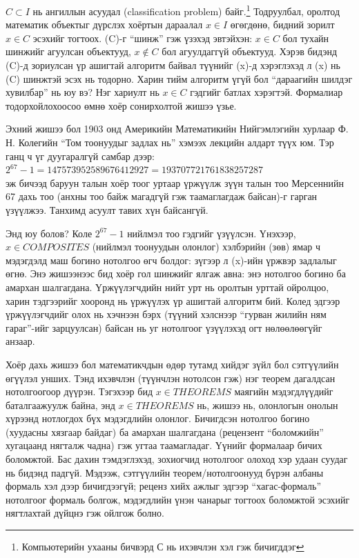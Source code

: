 $C \subset I$ нь ангиллын асуудал (classification problem) байг.\footnote{Компьютерийн ухааны бичвэрд С нь ихэвчлэн хэл гэж бичигддэг} Тодруулбал, оролтод математик объектыг дүрслэх хоёртын дараалал $x \in I$ өгөгдөнө, бидний зорилт $x \in C$ эсэхийг тогтоох. (C)-г “шинж” гэж үзэхэд эвтэйхэн:  $x \in C$ бол тухайн шинжийг агуулсан объектууд,  $x \notin C$ бол агуулдаггүй объектууд. Хэрэв бидэнд (C)-д зориулсан үр ашигтай алгоритм байвал түүнийг (x)-д хэрэглэхэд л (x) нь (C) шинжтэй эсэх нь тодорно. Харин тийм алгоритм үгүй бол “дараагийн шилдэг хувилбар” нь юу вэ? Нэг хариулт нь $x \in C$ гэдгийг батлах хэрэгтэй. Формалиар тодорхойлохоосоо өмнө хоёр сонирхолтой жишээ үзье.


Эхний жишээ бол 1903 онд Америкийн Математикийн Нийгэмлэгийн хурлаар Ф. Н. Колегийн “Том тоонуудыг задлах нь” хэмээх лекцийн алдарт түүх юм. Тэр ганц ч үг дуугаралгүй самбар дээр: \\
$2^67 - 1 = 147573952589676412927 = 193707721761838257287 $\\
эж бичээд баруун талын хоёр тоог уртаар үржүүлж зүүн талын тоо Мерсеннийн 67 дахь тоо (анхны тоо байж магадгүй гэж таамаглагдаж байсан)-г гарган үзүүлжээ. Танхимд асуулт тавих хүн байсангүй.


Энд юу болов? Коле $2^67-1$ нийлмэл тоо гэдгийг үзүүлсэн. Үнэхээр, $x \in COMPOSITES$  (нийлмэл тоонуудын олонлог) хэлбэрийн (зөв) ямар ч мэдэгдэлд маш богино нотолгоо өгч болдог: зүгээр л (x)-ийн үржвэр задлалыг өгнө. Энэ жишээнээс бид хоёр гол шинжийг ялгаж авна: энэ нотолгоо богино ба амархан шалгагдана. Үржүүлэгчдийн нийт урт нь оролтын урттай ойролцоо, харин тэдгээрийг хооронд нь үржүүлэх үр ашигтай алгоритм бий. Колед эдгээр үржүүлэгчдийг олох нь хэчнээн бэрх (түүний хэлснээр “гурван жилийн ням гараг”-ийг зарцуулсан) байсан нь уг нотолгоог үзүүлэхэд огт нөлөөлөөгүйг анзаар.



Хоёр дахь жишээ бол математикчдын өдөр тутамд хийдэг зүйл бол сэтгүүлийн өгүүлэл унших. Тэнд ихэвчлэн (түүнчлэн нотолсон гэж) нэг теорем дагалдсан нотолгоогоор дүүрэн. Тэгэхээр бид $x \in THEOREMS$ маягийн мэдэгдлүүдийг баталгаажуулж байна, энд $x \in THEOREMS$ нь, жишээ нь, олонлогын онолын хүрээнд нотлогдох бүх мэдэгдлийн олонлог. Бичигдсэн нотолгоо богино (хуудасны хязгаар байдаг) ба амархан шалгагдана (рецензент “боломжийн” хугацаанд нягталж чадна) гэж угтаа таамагладаг. Үүнийг формалаар бичих боломжтой. Бас дахин тэмдэглэхэд, зохиогчид нотолгоог олоход хэр удаан суудаг нь бидэнд падгүй. Мэдээж, сэтгүүлийн теорем/нотолгоонууд бүрэн албаны формаль хэл дээр бичигдээгүй; реценз хийх ажлыг эдгээр “хагас-формаль” нотолгоог формаль болгож, мэдэгдлийн үнэн чанарыг тогтоох боломжтой эсэхийг нягтлахтай дүйцнэ гэж ойлгож болно.


